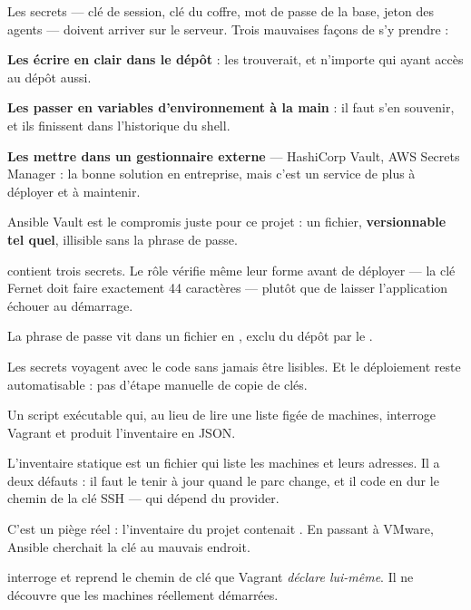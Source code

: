 \pourquoi
Les secrets --- clé de session, clé du coffre, mot de passe de la base, jeton des
agents --- doivent arriver sur le serveur. Trois mauvaises façons de s'y
prendre :

\textbf{Les écrire en clair dans le dépôt} :  les trouverait, et
n'importe qui ayant accès au dépôt aussi.

\textbf{Les passer en variables d'environnement à la main} : il faut s'en
souvenir, et ils finissent dans l'historique du shell.

\textbf{Les mettre dans un gestionnaire externe} --- HashiCorp Vault, AWS Secrets
Manager : la bonne solution en entreprise, mais c'est un service de plus à
déployer et à maintenir.

Ansible Vault est le compromis juste pour ce projet : un fichier,
\textbf{versionnable tel quel}, illisible sans la phrase de passe.

\role
{} contient trois secrets. Le
rôle  vérifie même leur forme avant de déployer --- la clé Fernet
doit faire exactement 44 caractères --- plutôt que de laisser l'application
échouer au démarrage.

La phrase de passe vit dans un fichier  en , exclu
du dépôt par le .

\apport
Les secrets voyagent avec le code sans jamais être lisibles. Et le déploiement
reste automatisable : pas d'étape manuelle de copie de clés.


\quoi
Un script exécutable qui, au lieu de lire une liste figée de machines, interroge
Vagrant et produit l'inventaire en JSON.

\pourquoi
L'inventaire statique est un fichier qui liste les machines et leurs adresses.
Il a deux défauts : il faut le tenir à jour quand le parc change, et il code en
dur le chemin de la clé SSH --- qui dépend du provider.

C'est un piège réel : l'inventaire du projet contenait
. En passant à VMware, Ansible cherchait la
clé au mauvais endroit.

\role
{} interroge  et
reprend le chemin de clé que Vagrant \emph{déclare lui-même}. Il ne découvre que
les machines réellement démarrées.

